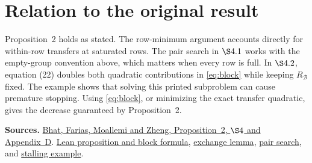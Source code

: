 \documentclass[12pt,a4paper]{article}
\begin{document}
\section*{Relation to the original result}
Proposition~2 holds as stated. The row-minimum argument accounts directly
for within-row transfers at saturated rows. The pair search in \(\S4.1\)
works with the empty-group convention above, which matters when every
row is full. In \(\S4.2\), equation (22) doubles both quadratic contributions
in \eqref{eq:block} while keeping \(R_{\mathcal B}\) fixed. The example shows
that solving this printed subproblem can cause premature stopping.
Using \eqref{eq:block}, or minimizing the exact transfer quadratic, gives the
decrease guaranteed by Proposition~2.

{\small\textbf{Sources.}
\href{https://moallemi.com/ciamac/papers/kernel-adp-2012.pdf\#page=18}{Bhat, Farias, Moallemi and Zheng, Proposition~2, \(\S4\) and Appendix~D}.
\href{https://github.com/nikhilpb/kadp/blob/main/lean/ActiveSet.lean}{Lean proposition and block formula},
\href{https://github.com/nikhilpb/kadp/blob/main/lean/Exchange.lean}{exchange lemma},
\href{https://github.com/nikhilpb/kadp/blob/main/lean/PairSelection.lean}{pair search},
and \href{https://github.com/nikhilpb/kadp/blob/main/lean/Examples/Proposition2.lean}{stalling example}.}
\end{document}
